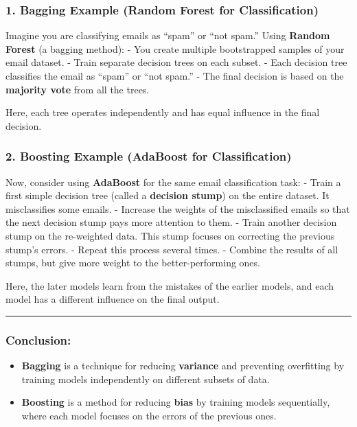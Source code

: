 \documentclass[12pt]{book}
\providecommand{\tightlist}{%
  \setlength{\itemsep}{0pt}\setlength{\parskip}{0pt}}
\begin{document}
\subsubsection{\texorpdfstring{\textbf{1. Bagging Example (Random Forest
for
Classification)}}{1. Bagging Example (Random Forest for Classification)}}\label{bagging-example-random-forest-for-classification}

Imagine you are classifying emails as ``spam'' or ``not spam.'' Using
\textbf{Random Forest} (a bagging method): - You create multiple
bootstrapped samples of your email dataset. - Train separate decision
trees on each subset. - Each decision tree classifies the email as
``spam'' or ``not spam.'' - The final decision is based on the
\textbf{majority vote} from all the trees.

Here, each tree operates independently and has equal influence in the
final decision.

\subsubsection{\texorpdfstring{\textbf{2. Boosting Example (AdaBoost for
Classification)}}{2. Boosting Example (AdaBoost for Classification)}}\label{boosting-example-adaboost-for-classification}

Now, consider using \textbf{AdaBoost} for the same email classification
task: - Train a first simple decision tree (called a \textbf{decision
stump}) on the entire dataset. It misclassifies some emails. - Increase
the weights of the misclassified emails so that the next decision stump
pays more attention to them. - Train another decision stump on the
re-weighted data. This stump focuses on correcting the previous stump's
errors. - Repeat this process several times. - Combine the results of
all stumps, but give more weight to the better-performing ones.

Here, the later models learn from the mistakes of the earlier models,
and each model has a different influence on the final output.

\begin{center}\rule{0.5\linewidth}{0.5pt}\end{center}

\subsubsection{\texorpdfstring{\textbf{Conclusion:}}{Conclusion:}}\label{conclusion}

\begin{itemize}
\tightlist
\item
  \textbf{Bagging} is a technique for reducing \textbf{variance} and
  preventing overfitting by training models independently on different
  subsets of data.
\item
  \textbf{Boosting} is a method for reducing \textbf{bias} by training
  models sequentially, where each model focuses on the errors of the
  previous ones.
\end{itemize}
\end{document}
